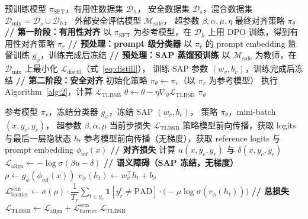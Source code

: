 \documentclass[lettersize,journal]{IEEEtran}
\begin{document}
\begin{algorithm}[h]
\caption{TLBSB两阶段训练流程}
\label{alg:1}
\begin{algorithmic}[1]
\REQUIRE 预训练模型 $\pi_{\text{SFT}}$，有用性数据集 $\mathcal{D}_h$，
         安全数据集 $\mathcal{D}_s$，混合数据集
         $\mathcal{D}_{\text{mix}}=\mathcal{D}_s\cup\mathcal{D}_h$，
         外部安全评估模型 $\mathcal{M}_{\text{safe}}$，
         超参数 $\beta,\alpha,\mu,\eta$
\ENSURE 最终对齐策略 $\pi_\theta$
\STATE \textbf{// 第一阶段：有用性对齐}
\STATE 以 $\pi_{\text{SFT}}$ 为参考模型，在 $\mathcal{D}_h$ 上用 DPO
       训练，得到有用性对齐策略 $\pi_r$
\STATE \textbf{// 预处理：prompt 级分类器}
\STATE 以 $\pi_r$ 的 prompt embedding 监督训练 $g_\phi$，训练完成后冻结
\STATE \textbf{// 预处理：SAP 蒸馏预训练}
\STATE 以 $\mathcal{M}_{\text{safe}}$ 为教师，在 $\mathcal{D}_{\text{mix}}$
       上最小化 $\mathcal{L}_{\text{distill}}$（式~\ref{eq:distill}），
       训练 SAP 参数 $(w_v,b_v)$，训练完成后冻结
\STATE \textbf{// 第二阶段：安全对齐}
\STATE 初始化策略 $\pi_\theta \leftarrow \pi_r$（以 $\pi_r$ 为参考模型）
    \STATE 执行 Algorithm~\ref{alg:2}，计算 $\mathcal{L}_{\text{TLBSB}}$
    \STATE $\theta \leftarrow \theta - \eta\nabla_\theta\mathcal{L}_{\text{TLBSB}}$
\ENDFOR
\RETURN $\pi_\theta$
\end{algorithmic}
\end{algorithm}

\begin{algorithm}[h]
\caption{TLBSB单步训练（第二阶段）}
\label{alg:2}
\begin{algorithmic}[1]
\REQUIRE 参考模型 $\pi_r$，冻结分类器 $g_\phi$，冻结 SAP $(w_v,b_v)$，
         策略 $\pi_\theta$，mini-batch $(x,y_c,y_r)$，
         超参数 $\beta,\alpha,\mu$
\ENSURE 当前步损失 $\mathcal{L}_{\text{TLBSB}}$
\STATE 策略模型前向传播，获取 logits 与最后一层隐状态 $h_t$
\STATE 参考模型前向传播（无梯度），获取 reference logits
       与 prompt embedding $\phi_{\text{ref}}(x)$
\STATE \textbf{// 对齐损失}
\STATE 计算 $u(x,y_c,y_r)$ 与 $\delta(x,y_c,y_r)$
\STATE $\mathcal{L}_{\text{align}} \leftarrow
       -\log\sigma\!\left(\beta u - \delta\right)$
\STATE \textbf{// 语义障碍（SAP 冻结，无梯度）}
\STATE $\rho \leftarrow g_\phi(\phi_{\text{ref}}(x))$
\STATE $v_\phi(h_t) \leftarrow w_v^\top h_t + b_v$
\STATE $\mathcal{L}^{\text{sem}}_{\text{barrier}} \leftarrow
       \sigma(\rho)\cdot\dfrac{1}{T_r}
       \displaystyle\sum_{t\in y_r}\mathbf{1}[y_r^t\neq\text{PAD}]
       \cdot\bigl(-\mu\log\sigma(v_\phi(h_t))\bigr)$
\STATE \textbf{// 总损失}
\STATE $\mathcal{L}_{\text{TLBSB}} \leftarrow
       \mathcal{L}_{\text{align}} +
       \mathcal{L}^{\text{sem}}_{\text{barrier}}$
\RETURN $\mathcal{L}_{\text{TLBSB}}$
\end{algorithmic}
\end{algorithm}
\end{document}
